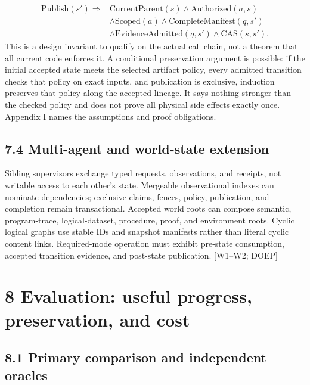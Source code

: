 \setcounter{equation}{1}
\begin{equation}\begin{aligned}
\mathrm{Publish}(s')\Rightarrow{}&\mathrm{CurrentParent}(s)\land\mathrm{Authorized}(a,s)\\
&\land\mathrm{Scoped}(a)\land\mathrm{CompleteManifest}(q,s')\\
&\land\mathrm{EvidenceAdmitted}(q,s')\land\mathrm{CAS}(s,s').
\end{aligned}\tag{2}\end{equation}
This is a design invariant to qualify on the actual call chain, not a theorem that all current code
enforces it. A conditional preservation argument is possible: if the initial accepted state meets the
selected artifact policy, every admitted transition checks that policy on exact inputs, and publication
is exclusive, induction preserves that policy along the accepted lineage. It says nothing stronger than
the checked policy and does not prove all physical side effects exactly once. Appendix I names the
assumptions and proof obligations.

\subsection*{7.4 Multi-agent and world-state extension}

Sibling supervisors exchange typed requests, observations, and receipts, not writable access to
each other’s state. Mergeable observational indexes can nominate dependencies; exclusive claims,
fences, policy, publication, and completion remain transactional. Accepted world roots can compose
semantic, program-trace, logical-dataset, procedure, proof, and environment roots. Cyclic logical
graphs use stable IDs and snapshot manifests rather than literal cyclic content links. Required-mode
operation must exhibit pre-state consumption, accepted transition evidence, and post-state publication.
[W1–W2; DOEP]

\section*{8 Evaluation: useful progress, preservation, and cost}
\subsection*{8.1 Primary comparison and independent oracles}

